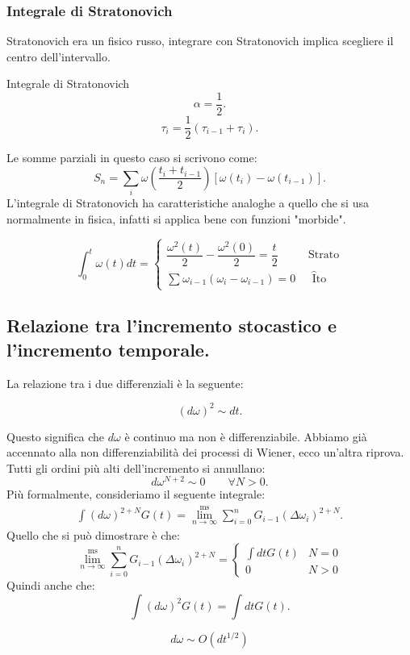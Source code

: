 \subsubsection{Integrale di Stratonovich}%
\label{subsub:Integrale di Stratonovich}
Stratonovich era un fisico russo, integrare con Stratonovich implica scegliere il centro dell'intervallo.
\begin{bluebox}{Integrale di Stratonovich}
    \[
        \alpha = \frac{1}{2}
    .\] 
    \[
        \tau_i = \frac{1}{2}\left(\tau_{i-1}+ \tau_i\right)
    .\] 
\end{bluebox}
\noindent
Le somme parziali in questo caso si scrivono come:
\[
    S_n = \sum_{i}^{} \omega\left(\frac{t_i + t_{i-1}}{2}\right)\left[\omega (t_i) -\omega (t_{i-1}) \right]
.\] 
L'integrale di Stratonovich ha caratteristiche analoghe a quello che si usa normalmente in fisica, infatti si applica bene con funzioni "morbide".

\begin{exmp}[]
    \[
	\int_{0}^{t} \omega (t) dt = 
	\begin{cases}
	    \dfrac{\omega^2(t)}{2}-\dfrac{\omega^2(0)}{2} = \dfrac{t}{2} & \text{ Strato}\\
	    \sum_{}^{} \omega_{i-1}\left(\omega_i-\omega_{i-1}\right) = 0 & \text{ }\hat{\text{I}}\text{to}
	\end{cases}
    \] 
\end{exmp}
\noindent

\subsection{Relazione tra l'incremento stocastico e l'incremento temporale.}%
\label{sub:Relazione tra l'incremento stocastico e l'incremento temporale.}
La relazione tra i due differenziali è la seguente:
\begin{greenbox}{}
\[
    \left(d\omega\right)^2\sim dt
.\] 
\end{greenbox}
\noindent
Questo significa che $d\omega$  è continuo ma non è differenziabile. Abbiamo già accennato alla non differenziabilità dei processi di Wiener, ecco un'altra riprova.\\
Tutti gli ordini più alti dell'incremento si annullano:
\[
    d\omega^{N+2} \sim 0 \qquad \forall N>0
.\] 
Più formalmente, consideriamo il seguente integrale:
\[\begin{aligned}
    \int\left(d\omega\right)^{2+N}G(t) = \lim^{\text{ms}}_{n \to \infty} \sum_{i=0}^{n} G_{i-1} (\Delta\omega_i)^{2+N} 
.\end{aligned}\]
Quello che si può dimostrare è che:
\[
  \lim^{\text{ms}}_{n \to \infty} \sum_{i=0}^{n} G_{i-1} (\Delta\omega_i)^{2+N} = 
  \begin{cases}
      \int dtG(t) & N=0\\
      0          & N>0 
  \end{cases}
\] 
Quindi anche che:
\[
    \int\left(d\omega\right)^2 G(t) = \int dtG(t) 
.\] 
\begin{redbox}{}
    \begin{equation}
	d\omega  \sim O(dt^{1 /2}) \label{eq:6_order}
    \end{equation}
\end{redbox}
\noindent
